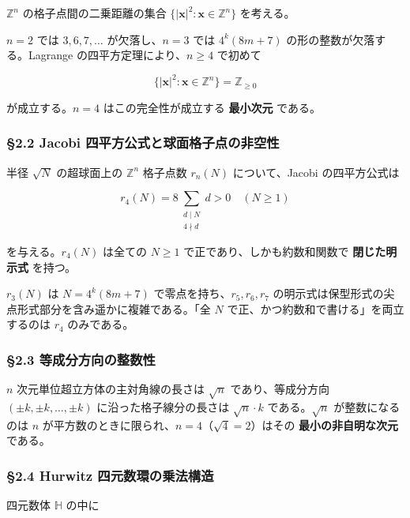 \documentclass[
  a4paper,11pt]{ltjsarticle}
\theoremstyle{definition}
\theoremstyle{remark}
\begin{document}
\(\mathbb{Z}^n\) の格子点間の二乗距離の集合
\(\{|\mathbf{x}|^2 : \mathbf{x} \in \mathbb{Z}^n\}\) を考える。

\(n = 2\) では \(3, 6, 7, \ldots\) が欠落し、\(n = 3\) では
\(4^k(8m+7)\) の形の整数が欠落する。Lagrange
の四平方定理により、\(n \geq 4\) で初めて

\[\{|\mathbf{x}|^2 : \mathbf{x} \in \mathbb{Z}^n\} = \mathbb{Z}_{\geq 0}\]

が成立する。\(n = 4\) はこの完全性が成立する \textbf{最小次元} である。

\subsubsection{§2.2 Jacobi
四平方公式と球面格子点の非空性}\label{jacobi-ux56dbux5e73ux65b9ux516cux5f0fux3068ux7403ux9762ux683cux5b50ux70b9ux306eux975eux7a7aux6027}

半径 \(\sqrt{N}\) の超球面上の \(\mathbb{Z}^n\) 格子点数 \(r_n(N)\)
について、Jacobi の四平方公式は

\[r_4(N) = 8 \sum_{\substack{d \mid N \\ 4 \nmid d}} d > 0 \quad (N \geq 1)\]

を与える。\(r_4(N)\) は全ての \(N \geq 1\)
で正であり、しかも約数和関数で \textbf{閉じた明示式} を持つ。

\(r_3(N)\) は \(N = 4^k(8m+7)\) で零点を持ち、\(r_5, r_6, r_7\)
の明示式は保型形式の尖点形式部分を含み遥かに複雑である。「全 \(N\)
で正、かつ約数和で書ける」を両立するのは \(r_4\) のみである。

\subsubsection{§2.3
等成分方向の整数性}\label{ux7b49ux6210ux5206ux65b9ux5411ux306eux6574ux6570ux6027}

\(n\) 次元単位超立方体の主対角線の長さは \(\sqrt{n}\) であり、等成分方向
\((\pm k, \pm k, \ldots, \pm k)\) に沿った格子線分の長さは
\(\sqrt{n} \cdot k\) である。\(\sqrt{n}\) が整数になるのは \(n\)
が平方数のときに限られ、\(n = 4\)（\(\sqrt{4} = 2\)）はその
\textbf{最小の非自明な次元} である。

\subsubsection{§2.4 Hurwitz
四元数環の乗法構造}\label{hurwitz-ux56dbux5143ux6570ux74b0ux306eux4e57ux6cd5ux69cbux9020}

四元数体 \(\mathbb{H}\) の中に
\end{document}
